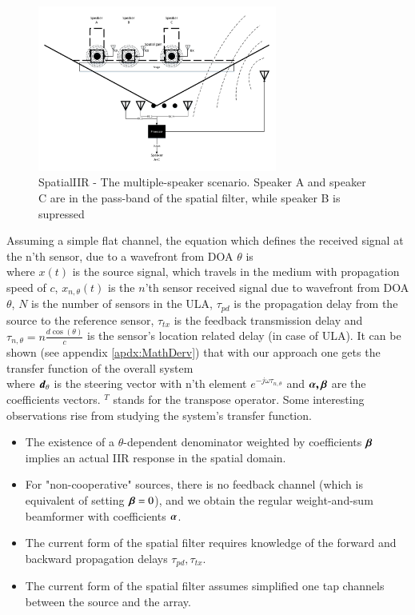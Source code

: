 \documentclass[a4paper,12pt,oneside]{report}
\begin{document}
\begin{figure}[!ht]
\begin{center}
\includegraphics[width=0.7\textwidth]{./Media/SpatialIIR_Applications/SpatialII_StageApplication_VER3.pdf}
\caption
{
SpatialIIR - The multiple-speaker scenario. 
Speaker A and speaker C are in the pass-band of the spatial filter, while speaker B is supressed
}
\label{fig:SpatialIIR_StageApplication}
\end{center}
\end{figure}
Assuming a simple flat channel, the equation which defines the received signal at the n'th sensor, due to a wavefront from DOA $\theta$ is 
\begin{equation}

\label{eqn:SingleSensorTemporalEquality}
\end{equation}
where $ x(t) $ is the source signal, which travels in the medium with propagation speed of $ c $, $ x_{n,\theta}(t) $ is the $ n $'th sensor received signal due to wavefront from DOA $ \theta $, $ N $ is the number of sensors in the ULA, $ \tau_{pd}$ is the propagation delay from the source to the reference sensor, $ \tau_{tx} $ is the feedback transmission delay and $ \tau_{n,\theta}=n\frac{d\cos(\theta)}{c} $ is the sensor's location related delay (in case of ULA). 
It can be shown (see appendix \ref{apdx:MathDerv}) that with our approach one gets the transfer function of the overall system
$$

$$
where $\vecnot{d}_{\theta}$ is the steering vector with n'th element $e^{-j\omega \tau_{n,\theta}}$ and $\vecnot{\alpha,\beta}$ are the coefficients vectors.
$^{T}$ stands for the transpose operator.
Some interesting observations rise from studying the system's transfer function.
\begin{itemize}
\item
{
The existence of a $ \theta $-dependent denominator weighted by coefficients $\vecnot{\beta}$ implies an actual IIR response in the spatial domain.
}
\item
{
For "non-cooperative" sources, there is no feedback channel (which is equivalent of setting $\vecnot{\beta} = 0 $), and we obtain the regular weight-and-sum beamformer with coefficients $\vecnot{\alpha}$.
}
\item 
{
The current form of the spatial filter requires knowledge of the forward and backward propagation delays $\tau_{pd},\tau_{tx}$.
}
\item 
{
The current form of the spatial filter assumes simplified one tap channels between the source and the array.
}
\end{itemize}
\end{document}
